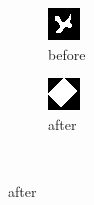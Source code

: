 \documentclass[12pt]{article}
\renewcommand{\subfiguresize}{.25\textwidth}
\begin{document}
\begin{figure}[h]\centering
    \begin{subfigure}[t]{\subfiguresize}
        \includegraphics[width=\textwidth]{img/image1.png}
        \caption{before}
    \end{subfigure}
    \hspace{2em}
    \begin{subfigure}[t]{\subfiguresize}
        \includegraphics[width=\textwidth]{img/image1-convexhull.png}
        \caption{after}
    \end{subfigure}\\[2em]


\end{figure}
\end{document}
